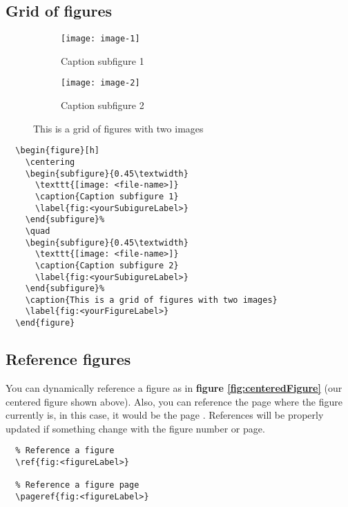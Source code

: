 \clearpage
\subsection{Grid of figures}

\begin{figure}[h]
  \centering
  \begin{subfigure}{0.45\textwidth}
    \texttt{[image: image-1]} 
    \caption{Caption subfigure 1}
    \label{fig:subim1}
  \end{subfigure}%
  \quad
  \begin{subfigure}{0.45\textwidth}
    \texttt{[image: image-2]}
    \caption{Caption subfigure 2}
    \label{fig:subim2}
  \end{subfigure}%
  \caption{This is a grid of figures with two images}
  \label{fig:figuresGrid}
\end{figure}

\begin{lstlisting}
  \begin{figure}[h]
    \centering
    \begin{subfigure}{0.45\textwidth}
      \texttt{[image: <file-name>]} 
      \caption{Caption subfigure 1}
      \label{fig:<yourSubigureLabel>}
    \end{subfigure}%
    \quad
    \begin{subfigure}{0.45\textwidth}
      \texttt{[image: <file-name>]}
      \caption{Caption subfigure 2}
      \label{fig:<yourSubigureLabel>}
    \end{subfigure}%
    \caption{This is a grid of figures with two images}
    \label{fig:<yourFigureLabel>}
  \end{figure}
\end{lstlisting}

\subsection{Reference figures}

You can dynamically reference a figure as in \textbf{figure \ref{fig:centeredFigure}} (our centered figure shown above). Also, you can reference the page where the figure currently is, in this case, it would be the page \textbf{\pageref{fig:centeredFigure}}. References will be properly updated if something change with the figure number or page.

\begin{lstlisting}
  % Reference a figure
  \ref{fig:<figureLabel>}

  % Reference a figure page
  \pageref{fig:<figureLabel>}
\end{lstlisting}